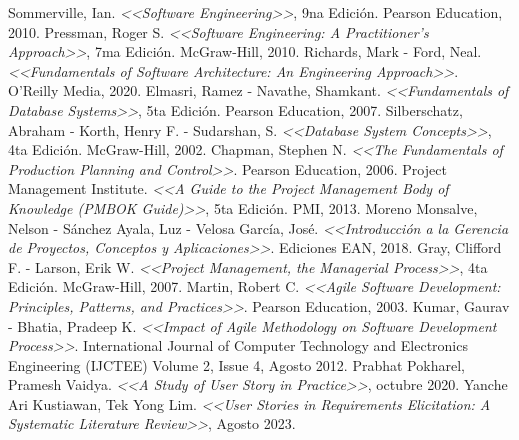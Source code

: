 \documentclass[a4paper, 12pt,twoside]{report}  %
\numberwithin{equation}{subsection} %
\begin{document}
\renewcommand{\bibname}{Bibliografía}
\begin{thebibliography}{99}

 Sommerville, Ian. \textit{<<Software Engineering>>}, 9na Edición. Pearson Education, 2010.
 Pressman, Roger S. \textit{<<Software Engineering: A Practitioner's Approach>>}, 7ma Edición. McGraw-Hill, 2010.
 Richards, Mark - Ford, Neal. \textit{<<Fundamentals of Software Architecture: An Engineering Approach>>}. O'Reilly Media, 2020.
 Elmasri, Ramez - Navathe, Shamkant. \textit{<<Fundamentals of Database Systems>>}, 5ta Edición. Pearson Education, 2007.
 Silberschatz, Abraham - Korth, Henry F. - Sudarshan, S. \textit{<<Database System Concepts>>}, 4ta Edición. McGraw-Hill, 2002.
 Chapman, Stephen N. \textit{<<The Fundamentals of Production Planning and Control>>}. Pearson Education, 2006.
 Project Management Institute. \textit{<<A Guide to the Project Management Body of Knowledge (PMBOK Guide)>>}, 5ta Edición. PMI, 2013.
 Moreno Monsalve, Nelson - Sánchez Ayala, Luz - Velosa García, José. \textit{<<Introducción a la Gerencia de Proyectos, Conceptos y Aplicaciones>>}. Ediciones EAN, 2018.
 Gray, Clifford F. - Larson, Erik W. \textit{<<Project Management, the Managerial Process>>}, 4ta Edición. McGraw-Hill, 2007.
 Martin, Robert C. \textit{<<Agile Software Development: Principles, Patterns, and Practices>>}.  Pearson Education, 2003.
 Kumar, Gaurav - Bhatia, Pradeep K. \textit{<<Impact of Agile Methodology on Software Development Process>>}. International Journal of Computer Technology and Electronics Engineering (IJCTEE)
Volume 2, Issue 4, Agosto 2012.
 Prabhat Pokharel, Pramesh Vaidya. \textit{<<A Study of User Story in Practice>>}, octubre 2020.
 Yanche Ari Kustiawan, Tek Yong Lim. \textit{<<User Stories in Requirements Elicitation: A Systematic Literature Review>>}, Agosto 2023.
\end{thebibliography}
\end{document}
